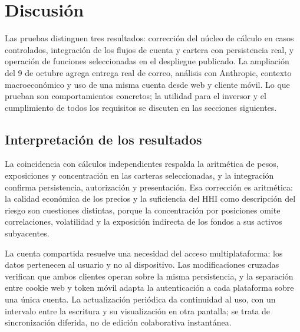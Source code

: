 \chapter{Discusión}\label{chap:discusion}

Las pruebas distinguen tres resultados: corrección del núcleo de cálculo en casos controlados, integración de los flujos de cuenta y cartera con persistencia real, y operación de funciones seleccionadas en el despliegue publicado. La ampliación del 9 de octubre agrega entrega real de correo, análisis con Anthropic, contexto macroeconómico y uso de una misma cuenta desde web y cliente móvil. Lo que prueban son comportamientos concretos; la utilidad para el inversor y el cumplimiento de todos los requisitos se discuten en las secciones siguientes.

\section{Interpretación de los resultados}\label{sec:interpretacion}

La coincidencia con cálculos independientes respalda la aritmética de pesos, exposiciones y concentración en las carteras seleccionadas, y la integración confirma persistencia, autorización y presentación. Esa corrección es aritmética: la calidad económica de los precios y la suficiencia del HHI como descripción del riesgo son cuestiones distintas, porque la concentración por posiciones omite correlaciones, volatilidad y la exposición indirecta de los fondos a sus activos subyacentes.

La cuenta compartida resuelve una necesidad del acceso multiplataforma: los datos pertenecen al usuario y no al dispositivo. Las modificaciones cruzadas verifican que ambos clientes operan sobre la misma persistencia, y la separación entre cookie web y token móvil adapta la autenticación a cada plataforma sobre una única cuenta. La actualización periódica da continuidad al uso, con un intervalo entre la escritura y su visualización en otra pantalla; se trata de sincronización diferida, no de edición colaborativa instantánea.

